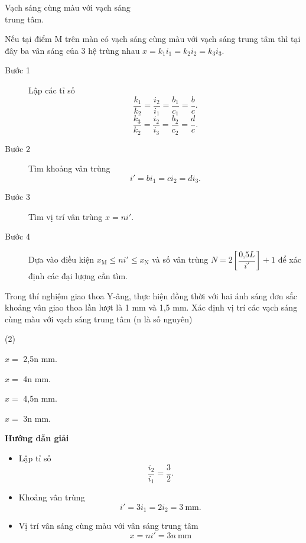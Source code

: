 \begin{dang}{Vạch sáng cùng màu với vạch sáng\\ trung tâm.}
{Nếu tại điểm M trên màn có vạch sáng cùng màu với vạch sáng trung tâm thì tại đây ba vân sáng của 3 hệ trùng nhau $x=k_1i_1=k_2i_2=k_3i_3.$


\begin{description}
	\item [Bước 1] Lập các tỉ số
	\begin{equation*}
	\dfrac{k_1}{k_2}=\dfrac{i_2}{i_1}=\dfrac{b_1}{c_1}=\dfrac{b}{c}.
	\end{equation*}
	\begin{equation*}
		\dfrac{k_3}{k_2}=\dfrac{i_2}{i_3}=\dfrac{b_2}{c_2}=\dfrac{d}{c}.
	\end{equation*}
	\item [Bước 2] Tìm khoảng vân trùng 
	\begin{equation*}
		i'=bi_1=ci_2 =di_3.
	\end{equation*}	
	\item [Bước 3] Tìm vị trí vân trùng $x = n i'$.
	\item [Bước 4]Dựa vào điều kiện $x_{\text{M}} \leq ni' \leq x_{\text{N}}$ và số vân trùng $N=2\left[\dfrac{\text{0,5} L}{i'}\right] +1$ để xác định các đại lượng cần tìm.
\end{description}
}

{Trong thí nghiệm giao thoa Y-âng, thực hiện đồng thời với hai ánh sáng đơn sắc khoảng vân giao thoa lần lượt là 1 mm và 1,5 mm. Xác định vị trí các vạch sáng cùng màu với vạch sáng trung tâm (n là số nguyên)
\begin{mcq}(2)
\item $x =$ 2,5n mm. 	
\item $x =$ 4n mm.   	  
\item $x =$ 4,5n mm.          
\item $x =$ 3n mm. 
\end{mcq}
}
{\begin{center}
	\textbf{Hướng dẫn giải}
\end{center}

\begin{itemize}
	\item Lập tỉ số
	\begin{equation*}
		\dfrac{i_2}{i_1}=\dfrac{3}{2}.
	\end{equation*}
	\item Khoảng vân trùng
	\begin{equation*}
		i'=3i_1=2i_2= 3\ \text{mm}.
	\end{equation*}
	\item Vị trí vân sáng cùng màu với vân sáng trung tâm
	\begin{equation*}
	x=ni'=3n\ \text{mm}
	\end{equation*}
\end{itemize}

}
\end{dang}
